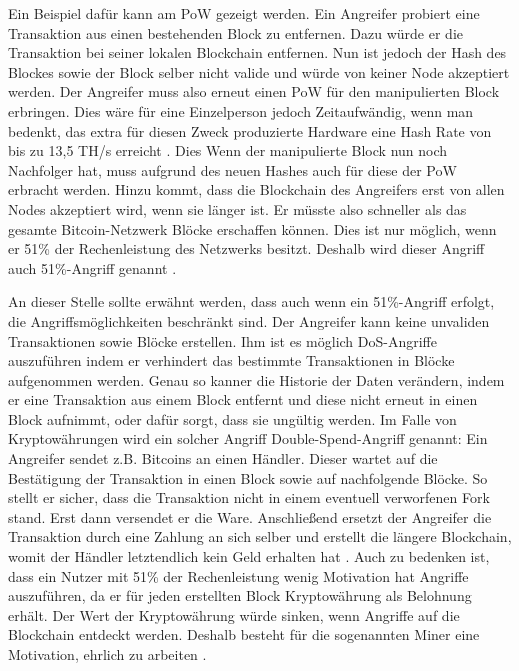 Ein Beispiel dafür kann am PoW gezeigt werden. Ein Angreifer probiert eine Transaktion aus einen bestehenden Block zu entfernen. Dazu würde er die Transaktion bei seiner lokalen Blockchain entfernen. Nun ist jedoch der Hash des Blockes sowie der Block selber nicht valide und würde von keiner Node akzeptiert werden. Der Angreifer muss also erneut einen PoW für den manipulierten Block erbringen. Dies wäre für eine Einzelperson jedoch Zeitaufwändig, wenn man bedenkt, das extra für diesen Zweck produzierte Hardware eine Hash Rate von bis zu 13,5 TH/s erreicht \cite{BitcoinminingLearnBitcoinmining}. Dies  Wenn der manipulierte Block nun noch Nachfolger hat, muss aufgrund des neuen Hashes auch für diese der PoW erbracht werden. Hinzu kommt, dass die Blockchain des Angreifers erst von allen Nodes akzeptiert wird, wenn sie länger ist. Er müsste also schneller als das gesamte Bitcoin-Netzwerk Blöcke erschaffen können.  Dies ist nur möglich, wenn er 51\% der Rechenleistung des Netzwerks besitzt. Deshalb wird dieser Angriff auch 51\%-Angriff genannt \cite{SwanBlockchainblueprintnew2015} \cite{EthereumTeamEthereumWhitePaper2017}.

An dieser Stelle sollte erwähnt werden, dass auch wenn ein 51\%-Angriff erfolgt, die Angriffsmöglichkeiten beschränkt sind. Der Angreifer kann keine unvaliden Transaktionen sowie Blöcke erstellen. Ihm ist es möglich DoS-Angriffe auszuführen indem er verhindert das bestimmte Transaktionen in Blöcke aufgenommen werden. Genau so kanner die Historie der Daten verändern, indem er eine Transaktion aus einem Block entfernt und diese nicht erneut in einen Block aufnimmt, oder dafür sorgt, dass sie ungültig werden. Im Falle von Kryptowährungen wird ein solcher Angriff Double-Spend-Angriff genannt: Ein Angreifer sendet z.B. Bitcoins an einen Händler. Dieser wartet auf die Bestätigung der Transaktion in einen Block sowie auf nachfolgende Blöcke. So stellt er sicher, dass die Transaktion nicht in einem eventuell verworfenen Fork stand. Erst dann versendet er die Ware. Anschließend ersetzt der Angreifer die Transaktion durch eine Zahlung an sich selber und erstellt die längere Blockchain, womit der Händler letztendlich kein Geld erhalten hat \cite{EthereumTeamEthereumWhitePaper2017}. Auch zu bedenken ist, dass ein Nutzer mit 51\% der Rechenleistung wenig Motivation hat Angriffe auszuführen, da er für jeden erstellten Block Kryptowährung als Belohnung erhält. Der Wert der Kryptowährung würde sinken, wenn Angriffe auf die Blockchain entdeckt werden. Deshalb besteht für die sogenannten Miner eine Motivation, ehrlich zu arbeiten \cite{AntonopoulosMasteringbitcoin2015}.

